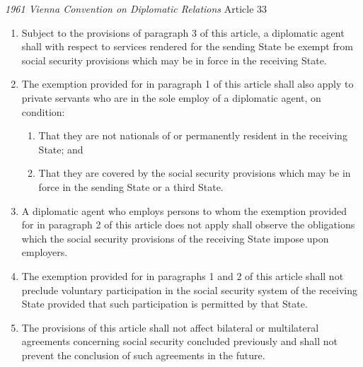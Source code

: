 \begin{conventiondetails}{\textit{1961 Vienna Convention on Diplomatic Relations} Article 33}
    \begin{enumerate}
        \item Subject to the provisions of paragraph 3 of this article, a diplomatic agent shall with respect to services rendered for the sending State be exempt from social security provisions which may be in force in the receiving State.
        \item The exemption provided for in paragraph 1 of this article shall also apply to private servants who are in the sole employ of a diplomatic agent, on condition:
        \begin{enumerate}[label=(\alph*)]
            \item That they are not nationals of or permanently resident in the receiving State; and
            \item That they are covered by the social security provisions which may be in force in the sending State or a third State.
        \end{enumerate}
        \item A diplomatic agent who employs persons to whom the exemption provided for in paragraph 2 of this article does not apply shall observe the obligations which the social security provisions of the receiving State impose upon employers.
        \item The exemption provided for in paragraphs 1 and 2 of this article shall not preclude voluntary participation in the social security system of the receiving State provided that such participation is permitted by that State.
        \item The provisions of this article shall not affect bilateral or multilateral agreements concerning social security concluded previously and shall not prevent the conclusion of such agreements in the future.
    \end{enumerate}
\end{conventiondetails}

